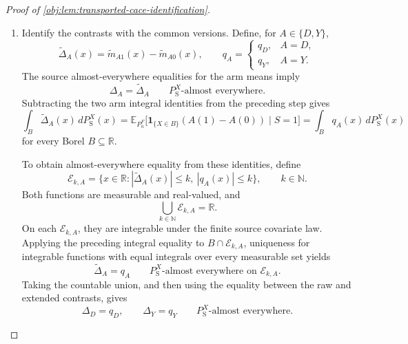 \documentclass[11pt]{article}
\begin{document}
\begin{proof}[Proof of \cref{obj:lem:transported-cace-identification}]
\begin{enumerate}
Using the source density identity and source support, the preceding equalities become
\[
\begin{aligned}
&\mathbb E_{P_n^F}
 \bigl[\mathbf1_{\{X\in B\}}\pi_z(X)\widetilde m_{Az}(X)
       \mid S=1\bigr]\\
&\qquad=
\int_{B_{\mathcal X}}
 f_{\mathrm S}(x)\pi_z(x)m_{Az}(x)\,dx\\
&\qquad=
\mathbb E_{P_n^F}
 \bigl[\mathbf1_{\{X\in B\}}\pi_z(X)A(z)\mid S=1\bigr].
\end{aligned}
\]
Thus \(\pi_z(X)\widetilde m_{Az}(X)\) is a version of the conditional mean of \(\pi_z(X)A(z)\) given \(X\) in the source population. Since \(\pi_z(X)\) is measurable with respect to \(X\), the conditional-expectation multiplication rule gives
\[
\pi_z(X)\widetilde m_{Az}(X)
=
\mathbb E_{P_n^F}[\pi_z(X)A(z)\mid X,S=1]
=
\pi_z(X)\mathbb E_{P_n^F}[A(z)\mid X,S=1].
\]
The positive lower bound on \(\pi_z(X)\) permits cancellation:
\[
\widetilde m_{Az}(X)
=\mathbb E_{P_n^F}[A(z)\mid X,S=1]
\qquad\text{almost surely in the source population}.
\]
Equivalently, for every Borel \(B\subseteq\mathbb R\),
\[
\mathbb E_{P_n^F}
 \bigl[\mathbf1_{\{X\in B\}}A(z)\mid S=1\bigr]
=
\int_B\widetilde m_{Az}(x)\,dP_{\mathrm S}^{X}(x).
\]

\item Identify the contrasts with the common versions. Define, for \(A\in\{D,Y\}\),
\[
\widetilde\Delta_A(x)
=\widetilde m_{A1}(x)-\widetilde m_{A0}(x),
\qquad
q_A=
\begin{cases}
q_D,&A=D,\\
q_Y,&A=Y.
\end{cases}
\]
The source almost-everywhere equalities for the arm means imply
\[
\Delta_A=\widetilde\Delta_A
\qquad P_{\mathrm S}^{X}\text{-almost everywhere}.
\]
Subtracting the two arm integral identities from the preceding step gives
\[
\int_B\widetilde\Delta_A(x)\,dP_{\mathrm S}^{X}(x)
=
\mathbb E_{P_n^F}
 \bigl[\mathbf1_{\{X\in B\}}(A(1)-A(0))\mid S=1\bigr]
=
\int_Bq_A(x)\,dP_{\mathrm S}^{X}(x)
\]
for every Borel \(B\subseteq\mathbb R\).

To obtain almost-everywhere equality from these identities, define
\[
\mathcal E_{k,A}
=
\bigl\{x\in\mathbb R:
 |\widetilde\Delta_A(x)|\le k,\ |q_A(x)|\le k\bigr\},
\qquad k\in\mathbb N.
\]
Both functions are measurable and real-valued, and
\[
\bigcup_{k\in\mathbb N}\mathcal E_{k,A}=\mathbb R.
\]
On each \(\mathcal E_{k,A}\), they are integrable under the finite source covariate law. Applying the preceding integral equality to
\(B\cap\mathcal E_{k,A}\), uniqueness for integrable functions with equal integrals over every measurable set yields
\[
\widetilde\Delta_A=q_A
\qquad
P_{\mathrm S}^{X}\text{-almost everywhere on }\mathcal E_{k,A}.
\]
Taking the countable union, and then using the equality between the raw and extended contrasts, gives
\[
\Delta_D=q_D,\qquad \Delta_Y=q_Y
\qquad P_{\mathrm S}^{X}\text{-almost everywhere}.
\]


\end{enumerate}
\end{proof}
\end{document}
